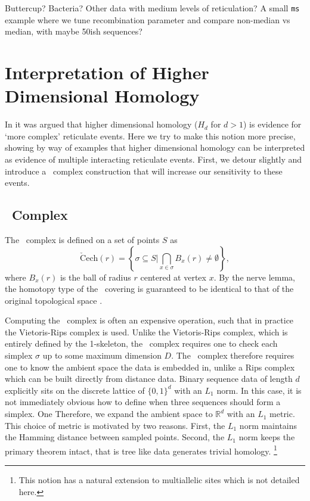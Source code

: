 Buttercup?
Bacteria?
Other data with medium levels of reticulation?
A small \texttt{ms} example where we tune recombination parameter and compare non-median vs median, with maybe 50ish sequences?

\section{Interpretation of Higher Dimensional Homology}
\label{sec:higher_homology}

In \citet{Chan:2013} it was argued that higher dimensional homology ($H_d$ for $d>1$) is evidence for `more complex' reticulate events.
Here we try to make this notion more precise, showing by way of examples that higher dimensional homology can be interpreted as evidence of multiple interacting reticulate events.
First, we detour slightly and introduce a \Cech\ complex construction that will increase our sensitivity to these events.

\subsection{\Cech\ Complex}
\label{subsec:cech_complex}
%
The \Cech\ complex is defined on a set of points $S$ as
\begin{equation}
\mathrm{\check{C}ech}(r) = \left\{\sigma \subseteq S | \bigcap_{x\in\sigma} B_x(r) \neq \emptyset \right\},
\end{equation}
where $B_x(r)$ is the ball of radius $r$ centered at vertex $x$.
By the nerve lemma, the homotopy type of the \Cech\ covering is guaranteed to be identical to that of the original topological space \citep{Borsuk:1948}.

Computing the \Cech\ complex is often an expensive operation, such that in practice the Vietoris-Rips complex is used.
Unlike the Vietoris-Rips complex, which is entirely defined by the 1-skeleton, the \Cech\ complex requires one to check each simplex $\sigma$ up to some maximum dimension $D$.
The \Cech\ complex therefore requires one to know the ambient space the data is embedded in, unlike a Rips complex which can be built directly from distance data.
Binary sequence data of length $d$ explicitly sits on the discrete lattice of $\{0,1\}^d$ with an $L_1$ norm.
In this case, it is not immediately obvious how to define when three sequences should form a simplex.
One
Therefore, we expand the ambient space to $\mathbb{R}^d$ with an $L_1$ metric.
This choice of metric is motivated by two reasons.
First, the $L_1$ norm maintains the Hamming distance between sampled points.
Second, the $L_1$ norm keeps the primary theorem intact, that is tree like data generates trivial homology.
\footnote{This notion has a natural extension to multiallelic sites which is not detailed here.}

